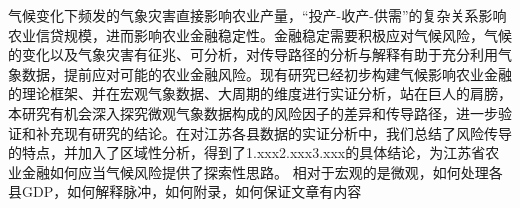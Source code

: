 \begin{abstractzh}
气候变化下频发的气象灾害直接影响农业产量，“投产-收产-供需”的复杂关系影响农业信贷规模，进而影响农业金融稳定性。金融稳定需要积极应对气候风险，气候的变化以及气象灾害有征兆、可分析，对传导路径的分析与解释有助于充分利用气象数据，提前应对可能的农业金融风险。现有研究已经初步构建气候影响农业金融的理论框架、并在宏观气象数据、大周期的维度进行实证分析，站在巨人的肩膀，本研究有机会深入探究微观气象数据构成的风险因子的差异和传导路径，进一步验证和补充现有研究的结论。在对江苏各县数据的实证分析中，我们总结了风险传导的特点，并加入了区域性分析，得到了1.xxx2.xxx3.xxx的具体结论，为江苏省农业金融如何应当气候风险提供了探索性思路。
相对于宏观的是微观，如何处理各县GDP，如何解释脉冲，如何附录，如何保证文章有内容
\end{abstractzh}
